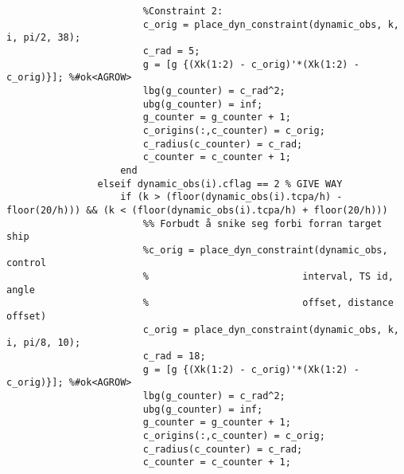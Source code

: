 \begin{lstlisting}
                        %Constraint 2:
                        c_orig = place_dyn_constraint(dynamic_obs, k, i, pi/2, 38);
                        c_rad = 5;
                        g = [g {(Xk(1:2) - c_orig)'*(Xk(1:2) - c_orig)}]; %#ok<AGROW> 
                        lbg(g_counter) = c_rad^2;
                        ubg(g_counter) = inf;
                        g_counter = g_counter + 1;
                        c_origins(:,c_counter) = c_orig;
                        c_radius(c_counter) = c_rad;
                        c_counter = c_counter + 1;
                    end
                elseif dynamic_obs(i).cflag == 2 % GIVE WAY
                    if (k > (floor(dynamic_obs(i).tcpa/h) - floor(20/h))) && (k < (floor(dynamic_obs(i).tcpa/h) + floor(20/h)))
                        %% Forbudt å snike seg forbi forran target ship  
                        %c_orig = place_dyn_constraint(dynamic_obs, control
                        %                           interval, TS id, angle
                        %                           offset, distance offset)
                        c_orig = place_dyn_constraint(dynamic_obs, k, i, pi/8, 10);
                        c_rad = 18;
                        g = [g {(Xk(1:2) - c_orig)'*(Xk(1:2) - c_orig)}]; %#ok<AGROW> 
                        lbg(g_counter) = c_rad^2;
                        ubg(g_counter) = inf;
                        g_counter = g_counter + 1;
                        c_origins(:,c_counter) = c_orig;
                        c_radius(c_counter) = c_rad;
                        c_counter = c_counter + 1;
                        

\end{lstlisting}
